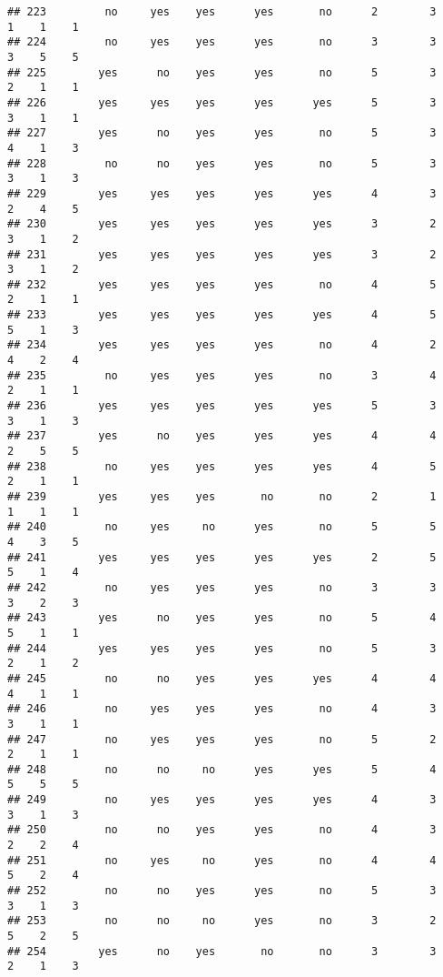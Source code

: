 \documentclass[
]{article}
\begin{document}
\begin{verbatim}
## 223         no     yes    yes      yes       no      2        3     1    1    1
## 224         no     yes    yes      yes       no      3        3     3    5    5
## 225        yes      no    yes      yes       no      5        3     2    1    1
## 226        yes     yes    yes      yes      yes      5        3     3    1    1
## 227        yes      no    yes      yes       no      5        3     4    1    3
## 228         no      no    yes      yes       no      5        3     3    1    3
## 229        yes     yes    yes      yes      yes      4        3     2    4    5
## 230        yes     yes    yes      yes      yes      3        2     3    1    2
## 231        yes     yes    yes      yes      yes      3        2     3    1    2
## 232        yes     yes    yes      yes       no      4        5     2    1    1
## 233        yes     yes    yes      yes      yes      4        5     5    1    3
## 234        yes     yes    yes      yes       no      4        2     4    2    4
## 235         no     yes    yes      yes       no      3        4     2    1    1
## 236        yes     yes    yes      yes      yes      5        3     3    1    3
## 237        yes      no    yes      yes      yes      4        4     2    5    5
## 238         no     yes    yes      yes      yes      4        5     2    1    1
## 239        yes     yes    yes       no       no      2        1     1    1    1
## 240         no     yes     no      yes       no      5        5     4    3    5
## 241        yes     yes    yes      yes      yes      2        5     5    1    4
## 242         no     yes    yes      yes       no      3        3     3    2    3
## 243        yes      no    yes      yes       no      5        4     5    1    1
## 244        yes     yes    yes      yes       no      5        3     2    1    2
## 245         no      no    yes      yes      yes      4        4     4    1    1
## 246         no     yes    yes      yes       no      4        3     3    1    1
## 247         no     yes    yes      yes       no      5        2     2    1    1
## 248         no      no     no      yes      yes      5        4     5    5    5
## 249         no     yes    yes      yes      yes      4        3     3    1    3
## 250         no      no    yes      yes       no      4        3     2    2    4
## 251         no     yes     no      yes       no      4        4     5    2    4
## 252         no      no    yes      yes       no      5        3     3    1    3
## 253         no      no     no      yes       no      3        2     5    2    5
## 254        yes      no    yes       no       no      3        3     2    1    3

\end{verbatim}
\end{document}
